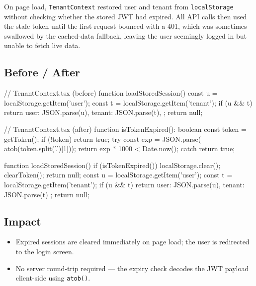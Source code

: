 \documentclass[12pt,a4paper]{report}
\newcommand{\diffL}{\noindent\begin{minipage}[t]{0.485\linewidth}}
\newcommand{\diffR}{\end{minipage}\hfill\begin{minipage}[t]{0.485\linewidth}}
\newcommand{\diffend}{\end{minipage}\par\smallskip}
\begin{document}
	On page load, \texttt{TenantContext} restored user and tenant from
	\texttt{localStorage} without checking whether the stored JWT had
	expired. All API calls then used the stale token until the first
	request bounced with a 401, which was sometimes swallowed by the
	cached-data fallback, leaving the user seemingly logged in but
	unable to fetch live data.

	\subsection*{Before / After}

	\diffL
	\begin{beforecode}
// TenantContext.tsx (before)
function loadStoredSession() {
  const u = localStorage.getItem('user');
  const t = localStorage.getItem('tenant');
  if (u && t) {
    return {
      user: JSON.parse(u),
      tenant: JSON.parse(t),
    };
  }
  return null;
}
	\end{beforecode}
	\diffR
	\begin{aftercode}
// TenantContext.tsx (after)
function isTokenExpired(): boolean {
  const token = getToken();
  if (!token) return true;
  try {
    const { exp } = JSON.parse(
      atob(token.split('.')[1]));
    return exp * 1000 < Date.now();
  } catch { return true; }
}

function loadStoredSession() {
  if (isTokenExpired()) {
    localStorage.clear();
    clearToken();
    return null;
  }
  const u = localStorage.getItem('user');
  const t = localStorage.getItem('tenant');
  if (u && t)
    return { user: JSON.parse(u),
             tenant: JSON.parse(t) };
  return null;
}
	\end{aftercode}
	\diffend

	\subsection*{Impact}
	\begin{itemize}
		\item Expired sessions are cleared immediately on page load; the user is redirected to the login screen.
		\item No server round-trip required --- the expiry check decodes the JWT payload client-side using \texttt{atob()}.
	\end{itemize}

\end{document}

